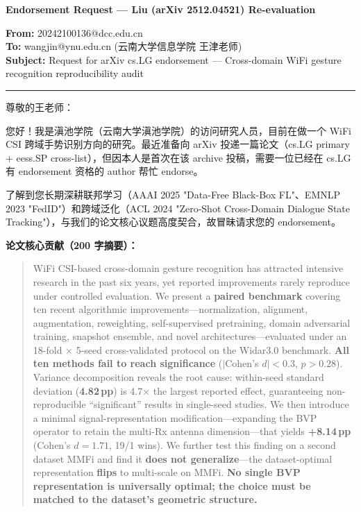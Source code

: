 \documentclass[11pt]{article}
\begin{document}
\begin{center}
\Large\bfseries Endorsement Request --- Liu (arXiv 2512.04521) Re-evaluation
\end{center}

\vspace{0.3cm}

\noindent\textbf{From:} 20242100136@dcc.edu.cn \\
\textbf{To:} wangjin@ynu.edu.cn (云南大学信息学院 王津老师) \\
\textbf{Subject:} Request for arXiv cs.LG endorsement --- Cross-domain WiFi gesture recognition reproducibility audit

\vspace{0.3cm}
\hrule
\vspace{0.3cm}

\noindent 尊敬的王老师：

您好！我是滇池学院（云南大学滇池学院）的访问研究人员，目前在做一个 WiFi CSI 跨域手势识别方向的研究。最近准备向 arXiv 投递一篇论文（cs.LG primary + eess.SP cross-list），但因本人是首次在该 archive 投稿，需要一位已经在 cs.LG 有 endorsement 资格的 author 帮忙 endorse。

了解到您长期深耕联邦学习（AAAI 2025 "Data-Free Black-Box FL"、EMNLP 2023 "FedID"）和跨域泛化（ACL 2024 "Zero-Shot Cross-Domain Dialogue State Tracking"），与我们的论文核心议题高度契合，故冒昧请求您的 endorsement。

\vspace{0.2cm}

\noindent\textbf{论文核心贡献（200 字摘要）：}

\begin{quote}
\small
WiFi CSI-based cross-domain gesture recognition has attracted intensive research in the past six years, yet reported improvements rarely reproduce under controlled evaluation. We present a \textbf{paired benchmark} covering ten recent algorithmic improvements---normalization, alignment, augmentation, reweighting, self-supervised pretraining, domain adversarial training, snapshot ensemble, and novel architectures---evaluated under an 18-fold × 5-seed cross-validated protocol on the Widar3.0 benchmark. \textbf{All ten methods fail to reach significance} ($|$Cohen's $d| < 0.3$, $p > 0.28$). Variance decomposition reveals the root cause: within-seed standard deviation (\textbf{4.82\,pp}) is 4.7× the largest reported effect, guaranteeing non-reproducible ``significant'' results in single-seed studies. We then introduce a minimal signal-representation modification---expanding the BVP operator to retain the multi-Rx antenna dimension---that yields \textbf{+8.14\,pp} (Cohen's $d = 1.71$, 19/1 wins). We further test this finding on a second dataset MMFi and find it \textbf{does not generalize}---the dataset-optimal representation \textbf{flips} to multi-scale on MMFi. \textbf{No single BVP representation is universally optimal; the choice must be matched to the dataset's geometric structure.}
\end{quote}
\end{document}

